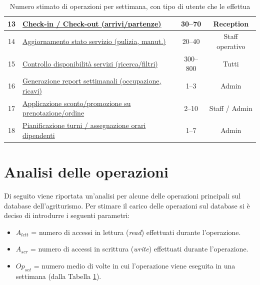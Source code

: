 \documentclass[a4paper,12pt]{report}
\begin{document}
\begin{table}[H]
\begin{tabularx}{\textwidth}{|c|>{\raggedright\arraybackslash}X|c|c|}
		\hline
		13          & \hyperref[op13]{Check-in / Check-out (arrivi/partenze)}                & 30--70            & Reception              \\
		\hline
		14          & \hyperref[op14]{Aggiornamento stato servizio (pulizia, manut.)}        & 20--40            & Staff operativo        \\
		\hline
		15          & \hyperref[op15]{Controllo disponibilità servizi (ricerca/filtri)}      & 300--800          & Tutti                  \\
		\hline
		16          & \hyperref[op16]{Generazione report settimanali (occupazione, ricavi)}  & 1--3              & Admin                  \\
		\hline
		17          & \hyperref[op17]{Applicazione sconto/promozione su prenotazione/ordine} & 2--10             & Staff / Admin          \\
		\hline
		18          & \hyperref[op18]{Pianificazione turni / assegnazione orari dipendenti}  & 1--7              & Admin                  \\
		\hline
	\end{tabularx}
	\caption{Numero stimato di operazioni per settimana, con tipo di utente che le effettua}
	\label{tab:operazioni-settimanali}
\end{table}

\newpage
\section{Analisi delle operazioni}
Di seguito viene riportata un'analisi per alcune delle operazioni principali sul database dell'agriturismo.
Per stimare il carico delle operazioni sul database si è deciso di introdurre i seguenti parametri:
\begin{itemize}
    \item $A_{lett}$ = numero di accessi in lettura (\textit{read}) effettuati durante l'operazione.
    \item $A_{scr}$ = numero di accessi in scrittura (\textit{write}) effettuati durante l'operazione.
    \item $Op_{set}$ = numero medio di volte in cui l'operazione viene eseguita in una settimana (dalla Tabella \ref{tab:operazioni-settimanali}).
\end{itemize}
\end{document}
